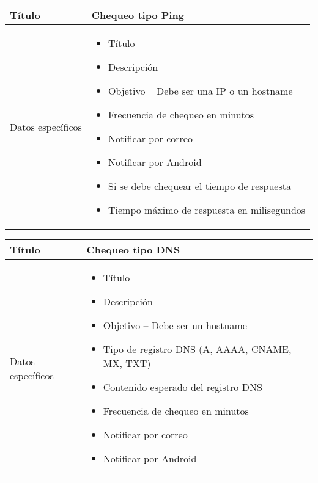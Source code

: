 \begin{center}
  
  \begin{tabularx}{\textwidth}{|l|X|}
    \hline

    Título & Chequeo tipo Ping \\

    \hline
    Datos específicos &

    \begin{itemize}
      \item Título 
      \item Descripción
      \item Objetivo -- Debe ser una IP o un hostname
      \item Frecuencia de chequeo en minutos
      \item Notificar por correo
      \item Notificar por Android
      \item Si se debe chequear el tiempo de respuesta
      \item Tiempo máximo de respuesta en milisegundos
    \end{itemize}
    \\
    
    \hline
    
  \end{tabularx}
\end{center}

\begin{center}
  
  \begin{tabularx}{\textwidth}{|l|X|}
    \hline

    Título & Chequeo tipo DNS \\

    \hline
    Datos específicos &

    \begin{itemize}
      \item Título 
      \item Descripción
      \item Objetivo -- Debe ser un hostname
      \item Tipo de registro DNS (A, AAAA, CNAME, MX, TXT)
      \item Contenido esperado del registro DNS
      \item Frecuencia de chequeo en minutos
      \item Notificar por correo
      \item Notificar por Android
    \end{itemize}
    \\
    
    \hline
    
  \end{tabularx}
\end{center}

